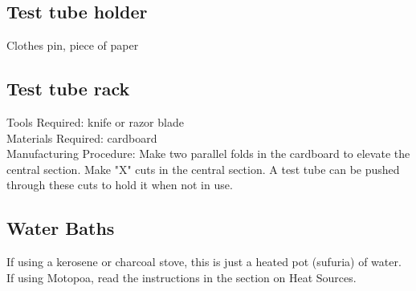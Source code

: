 \subsection*{Test tube holder}
Clothes pin, piece of paper

\subsection*{Test tube rack}
Tools Required: knife or razor blade\\
Materials Required: cardboard\\
Manufacturing Procedure: Make two parallel folds in the cardboard to elevate the central section. Make "X" cuts in the central section. A test tube can be pushed through these cuts to hold it when not in use.

\subsection*{Water Baths}
If using a kerosene or charcoal stove, this is just a heated pot (sufuria) of water. If using Motopoa, read the instructions in the section on Heat Sources.